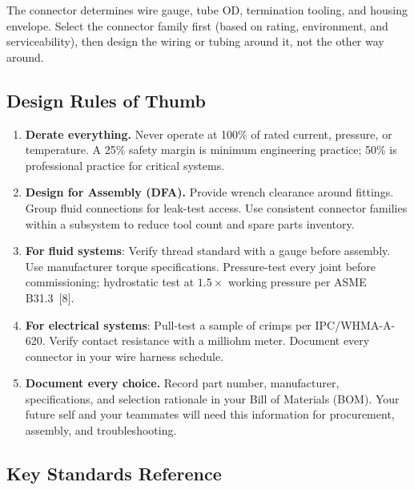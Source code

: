\documentclass[11pt,letterpaper,twoside,openany]{book}
\begin{document}
\begin{tipbox}
The connector determines wire gauge, tube OD, termination tooling, and housing envelope. Select the connector family first (based on rating, environment, and serviceability), then design the wiring or tubing around it, not the other way around.
\end{tipbox}

\subsection{Design Rules of Thumb}

\begin{enumerate}[leftmargin=1.5em]
  \item \textbf{Derate everything.} Never operate at 100\% of rated current, pressure, or temperature. A 25\% safety margin is minimum engineering practice; 50\% is professional practice for critical systems.

  \item \textbf{Design for Assembly (DFA).} Provide wrench clearance around fittings. Group fluid connections for leak-test access. Use consistent connector families within a subsystem to reduce tool count and spare parts inventory.

  \item \textbf{For fluid systems}: Verify thread standard with a gauge before assembly. Use manufacturer torque specifications. Pressure-test every joint before commissioning; hydrostatic test at $1.5\times$ working pressure per ASME B31.3~[8].

  \item \textbf{For electrical systems}: Pull-test a sample of crimps per IPC/WHMA-A-620. Verify contact resistance with a milliohm meter. Document every connector in your wire harness schedule.

  \item \textbf{Document every choice.} Record part number, manufacturer, specifications, and selection rationale in your Bill of Materials (BOM). Your future self and your teammates will need this information for procurement, assembly, and troubleshooting.
\end{enumerate}


\subsection{Key Standards Reference}
\end{document}
